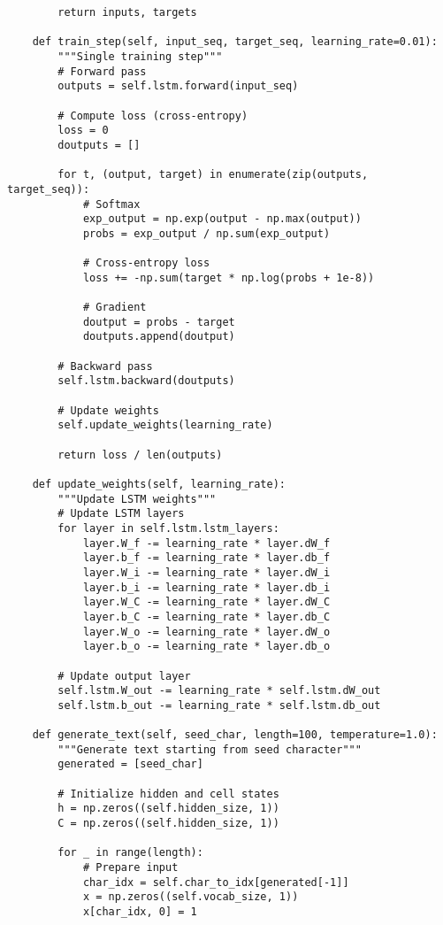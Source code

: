 ﻿\documentclass[12pt,a4paper]{article}
\begin{document}
\begin{lstlisting}
        return inputs, targets
    
    def train_step(self, input_seq, target_seq, learning_rate=0.01):
        """Single training step"""
        # Forward pass
        outputs = self.lstm.forward(input_seq)
        
        # Compute loss (cross-entropy)
        loss = 0
        doutputs = []
        
        for t, (output, target) in enumerate(zip(outputs, target_seq)):
            # Softmax
            exp_output = np.exp(output - np.max(output))
            probs = exp_output / np.sum(exp_output)
            
            # Cross-entropy loss
            loss += -np.sum(target * np.log(probs + 1e-8))
            
            # Gradient
            doutput = probs - target
            doutputs.append(doutput)
        
        # Backward pass
        self.lstm.backward(doutputs)
        
        # Update weights
        self.update_weights(learning_rate)
        
        return loss / len(outputs)
    
    def update_weights(self, learning_rate):
        """Update LSTM weights"""
        # Update LSTM layers
        for layer in self.lstm.lstm_layers:
            layer.W_f -= learning_rate * layer.dW_f
            layer.b_f -= learning_rate * layer.db_f
            layer.W_i -= learning_rate * layer.dW_i
            layer.b_i -= learning_rate * layer.db_i
            layer.W_C -= learning_rate * layer.dW_C
            layer.b_C -= learning_rate * layer.db_C
            layer.W_o -= learning_rate * layer.dW_o
            layer.b_o -= learning_rate * layer.db_o
        
        # Update output layer
        self.lstm.W_out -= learning_rate * self.lstm.dW_out
        self.lstm.b_out -= learning_rate * self.lstm.db_out
    
    def generate_text(self, seed_char, length=100, temperature=1.0):
        """Generate text starting from seed character"""
        generated = [seed_char]
        
        # Initialize hidden and cell states
        h = np.zeros((self.hidden_size, 1))
        C = np.zeros((self.hidden_size, 1))
        
        for _ in range(length):
            # Prepare input
            char_idx = self.char_to_idx[generated[-1]]
            x = np.zeros((self.vocab_size, 1))
            x[char_idx, 0] = 1
            

\end{lstlisting}
\end{document}
